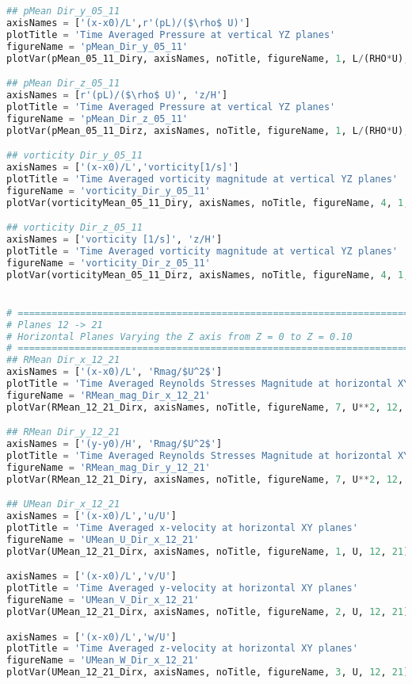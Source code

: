 \begin{lstlisting}[language=python]
## pMean Dir_y_05_11
axisNames = ['(x-x0)/L',r'(pL)/($\rho$ U)']
plotTitle = 'Time Averaged Pressure at vertical YZ planes'
figureName = 'pMean_Dir_y_05_11'
plotVar(pMean_05_11_Diry, axisNames, noTitle, figureName, 1, L/(RHO*U), 5, 11)

## pMean Dir_z_05_11
axisNames = [r'(pL)/($\rho$ U)', 'z/H']
plotTitle = 'Time Averaged Pressure at vertical YZ planes'
figureName = 'pMean_Dir_z_05_11'
plotVar(pMean_05_11_Dirz, axisNames, noTitle, figureName, 1, L/(RHO*U), 5, 11)

## vorticity Dir_y_05_11
axisNames = ['(x-x0)/L','vorticity[1/s]']
plotTitle = 'Time Averaged vorticity magnitude at vertical YZ planes'
figureName = 'vorticity_Dir_y_05_11'
plotVar(vorticityMean_05_11_Diry, axisNames, noTitle, figureName, 4, 1, 5, 11)

## vorticity Dir_z_05_11
axisNames = ['vorticity [1/s]', 'z/H']
plotTitle = 'Time Averaged vorticity magnitude at vertical YZ planes'
figureName = 'vorticity_Dir_z_05_11'
plotVar(vorticityMean_05_11_Dirz, axisNames, noTitle, figureName, 4, 1, 5, 11)


# =============================================================================
# Planes 12 -> 21
# Horizontal Planes Varying the Z axis from Z = 0 to Z = 0.10
# =============================================================================
## RMean Dir_x_12_21
axisNames = ['(x-x0)/L', 'Rmag/$U^2$']
plotTitle = 'Time Averaged Reynolds Stresses Magnitude at horizontal XY planes'
figureName = 'RMean_mag_Dir_x_12_21'
plotVar(RMean_12_21_Dirx, axisNames, noTitle, figureName, 7, U**2, 12, 21)

## RMean Dir_y_12_21
axisNames = ['(y-y0)/H', 'Rmag/$U^2$']
plotTitle = 'Time Averaged Reynolds Stresses Magnitude at horizontal XY planes'
figureName = 'RMean_mag_Dir_y_12_21'
plotVar(RMean_12_21_Diry, axisNames, noTitle, figureName, 7, U**2, 12, 21)

## UMean Dir_x_12_21
axisNames = ['(x-x0)/L','u/U']
plotTitle = 'Time Averaged x-velocity at horizontal XY planes'
figureName = 'UMean_U_Dir_x_12_21'
plotVar(UMean_12_21_Dirx, axisNames, noTitle, figureName, 1, U, 12, 21)

axisNames = ['(x-x0)/L','v/U']
plotTitle = 'Time Averaged y-velocity at horizontal XY planes'
figureName = 'UMean_V_Dir_x_12_21'
plotVar(UMean_12_21_Dirx, axisNames, noTitle, figureName, 2, U, 12, 21)

axisNames = ['(x-x0)/L','w/U']
plotTitle = 'Time Averaged z-velocity at horizontal XY planes'
figureName = 'UMean_W_Dir_x_12_21'
plotVar(UMean_12_21_Dirx, axisNames, noTitle, figureName, 3, U, 12, 21)


\end{lstlisting}
